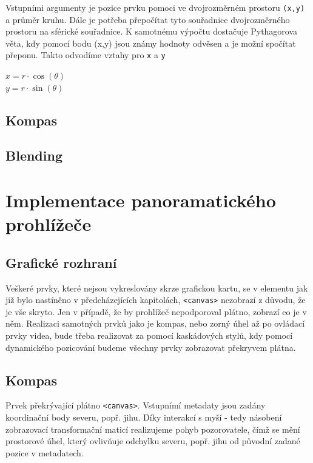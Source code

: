 Vstupními argumenty je pozice prvku pomoci ve dvojrozměrném prostoru \texttt{(x,y)} a průměr kruhu. Dále je potřeba přepočítat tyto souřadnice dvojrozměrného prostoru na sférické souřadnice. K samotnému výpočtu dostačuje Pythagorova věta, kdy pomocí bodu (x,y) jsou známy hodnoty odvěsen a je možní spočítat přeponu. Takto odvodíme vztahy pro \texttt{x} a \texttt{y}

\begin{description}
	\item [{\LARGE $ x = r\cdot\cos(\theta) $}] 
	\item [{\LARGE $ y = r\cdot\sin(\theta) $}]
\end{description}
 

\newpage


\section{Kompas}

\section{Blending}

\chapter{Implementace panoramatického prohlížeče}
\label{chapter:4}


\section{Grafické rozhraní}
Veškeré prvky, které nejsou vykreslovány skrze grafickou kartu, se v elementu jak již bylo nastíněno v předcházejících kapitolách, \texttt{<canvas>} nezobrazí z důvodu, že je vše skryto. Jen v případě, že by prohlížeč nepodporoval plátno, zobrazí co je v něm. Realizaci samotných prvků jako je kompas, nebo zorný úhel až po ovládací prvky videa, bude třeba realizovat za pomocí kaskádových stylů, kdy pomocí dynamického pozicování budeme všechny prvky zobrazovat překryvem plátna.

\section{Kompas}
Prvek překrývající plátno \texttt{<canvas>}. Vstupnímí metadaty jsou zadány koordinační body severu, popř. jihu. Díky interakcí s myší - tedy násobení zobrazovací transformační maticí realizujeme pohyb pozorovatele, čímž se mění prostorové úhel, který ovlivňuje odchylku severu, popř. jihu od původní zadané pozice v metadatech.

